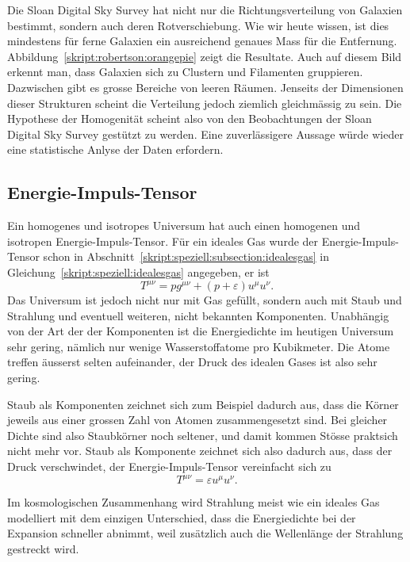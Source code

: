 Die Sloan Digital Sky Survey hat nicht nur die Richtungsverteilung von
Galaxien bestimmt, sondern auch deren Rotverschiebung.
Wie wir heute wissen, ist dies mindestens für ferne Galaxien ein ausreichend
genaues Mass für die Entfernung.
Abbildung~\ref{skript:robertson:orangepie} zeigt die Resultate.
Auch auf diesem Bild erkennt man, dass Galaxien sich zu Clustern
und Filamenten gruppieren.
Dazwischen gibt es grosse Bereiche von leeren Räumen.
Jenseits der Dimensionen dieser Strukturen scheint die Verteilung jedoch
ziemlich gleichmässig zu sein.
Die Hypothese der Homogenität scheint also von den Beobachtungen der
Sloan Digital Sky Survey gestützt zu werden.
Eine zuverlässigere Aussage würde wieder eine statistische Anlyse der 
Daten erfordern.

\subsection{Energie-Impuls-Tensor}
Ein homogenes und isotropes Universum hat auch einen homogenen
und isotropen Energie-Impuls-Tensor.
Für ein ideales Gas wurde der Energie-Impuls-Tensor schon in
Abschnitt~\ref{skript:speziell:subsection:idealesgas}
in Gleichung~\eqref{skript:speziell:idealesgas} angegeben, er ist
\[
T^{\mu\nu} = pg^{\mu\nu} + (p+\varepsilon)u^\mu u^\nu.
\]
Das Universum ist jedoch nicht nur mit Gas gefüllt, sondern auch
mit Staub und Strahlung und eventuell weiteren, nicht bekannten
Komponenten.
Unabhängig von der Art der der Komponenten ist die Energiedichte
im heutigen Universum sehr gering, nämlich nur wenige Wasserstoffatome
pro Kubikmeter.
Die Atome treffen äusserst selten aufeinander,
der Druck des idealen Gases ist also sehr gering.

Staub als Komponenten zeichnet sich zum Beispiel dadurch aus, dass die Körner
jeweils aus einer grossen Zahl von Atomen zusammengesetzt sind.
Bei gleicher Dichte sind also Staubkörner noch seltener, und damit kommen
Stösse praktsich nicht mehr vor.
Staub als Komponente zeichnet sich also dadurch aus, dass der Druck
verschwindet, der Energie-Impuls-Tensor vereinfacht sich zu
\[
T^{\mu\nu}
=
\varepsilon u^\mu u^\nu.
\]

Im kosmologischen Zusammenhang wird Strahlung meist wie ein
ideales Gas modelliert mit dem einzigen Unterschied, dass
die Energiedichte bei der Expansion schneller abnimmt, weil
zusätzlich auch die Wellenlänge der Strahlung gestreckt wird.

